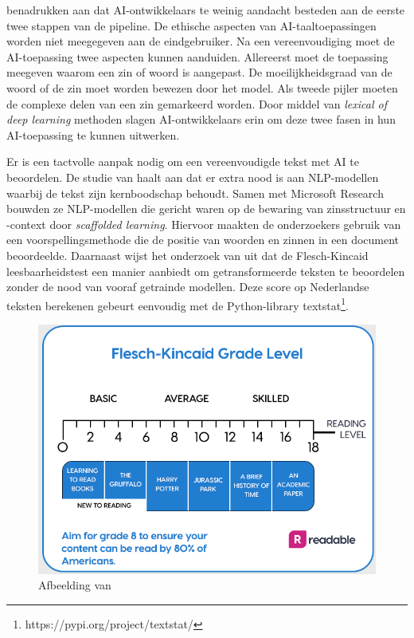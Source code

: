 \textcite{Garbacea2021} benadrukken aan dat AI-ontwikkelaars te weinig aandacht besteden aan de eerste twee stappen van de pipeline. De ethische aspecten van AI-taaltoepassingen worden niet meegegeven aan de eindgebruiker. Na een vereenvoudiging moet de AI-toepassing twee aspecten kunnen aanduiden. Allereerst moet de toepassing meegeven waarom een zin of woord is aangepast. De moeilijkheidsgraad van de woord of de zin moet worden bewezen door het model. Als tweede pijler moeten de complexe delen van een zin gemarkeerd worden. Door middel van \textit{lexical of deep learning} methoden slagen AI-ontwikkelaars erin om deze twee fasen in hun AI-toepassing te kunnen uitwerken.

Er is een tactvolle aanpak nodig om een vereenvoudigde tekst met AI te beoordelen. De studie van \textcite{Swayamdipta2019} haalt aan dat er extra nood is aan NLP-modellen waarbij de tekst zijn kernboodschap behoudt. Samen met Microsoft Research bouwden ze NLP-modellen die gericht waren op de bewaring van zinsstructuur en -context door \emph{scaffolded learning}. Hiervoor maakten de onderzoekers gebruik van een voorspellingsmethode die de positie van woorden en zinnen in een document beoordeelde. Daarnaast wijst het onderzoek van \textcite{Readable2021} uit dat de Flesch-Kincaid leesbaarheidstest een manier aanbiedt om getransformeerde teksten te beoordelen zonder de nood van vooraf getrainde modellen. Deze score op Nederlandse teksten berekenen gebeurt eenvoudig met de Python-library textstat\footnote{https://pypi.org/project/textstat/}. 

\begin{figure}
	\includegraphics[width=\linewidth]{img/Screenshot_302.png}
	\caption{Afbeelding van \autocite{Readable2021}}
\end{figure}

